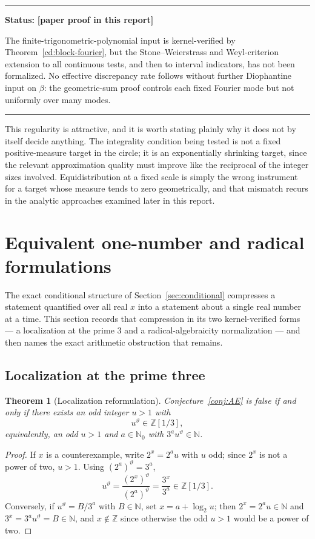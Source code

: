 \documentclass[11pt,oneside]{article}
\newtheorem{theorem}{Theorem}[section]
\theoremstyle{definition}
\theoremstyle{remark}
\newcommand{\N}{\mathbb N}
\newcommand{\Nzero}{\mathbb N_0}
\newcommand{\Z}{\mathbb Z}
\newcommand{\thetaq}{\vartheta}
\newcommand{\Zthree}{\Z[1/3]}
\newcommand{\statusnew}{\textcolor{newgreen}{\textbf{[paper proof in this report]}}}
\newenvironment{statusbox}[1]
{\begin{center}\begin{minipage}{0.94\textwidth}\raggedright\hbadness=10000\hrule
\vspace{0.45em}\textbf{Status:} #1\par\vspace{0.35em}}
{\vspace{0.35em}\hrule\end{minipage}\end{center}}
\begin{document}
\begin{statusbox}{\statusnew{}}
The finite-trigonometric-polynomial input is kernel-verified by
Theorem~\ref{cd:block-fourier}, but the Stone--Weierstrass and Weyl-criterion extension to all
continuous tests, and then to interval indicators, has not been formalized.  No effective
discrepancy rate follows without further Diophantine input on $\beta$: the geometric-sum proof
controls each fixed Fourier mode but not uniformly over many modes.
\end{statusbox}

This regularity is attractive, and it is worth stating plainly why it does not by itself decide
anything.  The integrality condition being tested is not a fixed positive-measure target in the
circle; it is an exponentially shrinking target, since the relevant approximation quality must
improve like the reciprocal of the integer sizes involved.  Equidistribution at a fixed scale is
simply the wrong instrument for a target whose measure tends to zero geometrically, and that
mismatch recurs in the analytic approaches examined later in this report.
\section{Equivalent one-number and radical formulations}
\label{sec:radical}

The exact conditional structure of Section~\ref{sec:conditional} compresses a statement
quantified over all real $x$ into a statement about a single real number at a time.  This
section records that compression in its two kernel-verified forms --- a localization at the
prime $3$ and a radical-algebraicity normalization --- and then names the exact arithmetic
obstruction that remains.

\subsection{Localization at the prime three}

\begin{theorem}[Localization reformulation]
\label{ra:thm-localization}
Conjecture~\ref{conj:AE} is false if and only if there exists an odd integer $u>1$ with
\[
u^{\thetaq}\in\Zthree,
\]
equivalently, an odd $u>1$ and $a\in\Nzero$ with $3^au^{\thetaq}\in\N$.
\end{theorem}

\begin{proof}
If $x$ is a counterexample, write $2^x=2^au$ with $u$ odd; since $2^x$ is not a power of
two, $u>1$.  Using $(2^a)^{\thetaq}=3^a$,
\[
u^{\thetaq}=\frac{(2^x)^{\thetaq}}{(2^a)^{\thetaq}}=\frac{3^x}{3^a}\in\Zthree .
\]
Conversely, if $u^{\thetaq}=B/3^a$ with $B\in\N$, set $x=a+\log_2u$; then $2^x=2^au\in\N$
and $3^x=3^au^{\thetaq}=B\in\N$, and $x\notin\Z$ since otherwise the odd $u>1$ would be a
power of two.
\end{proof}
\end{document}
